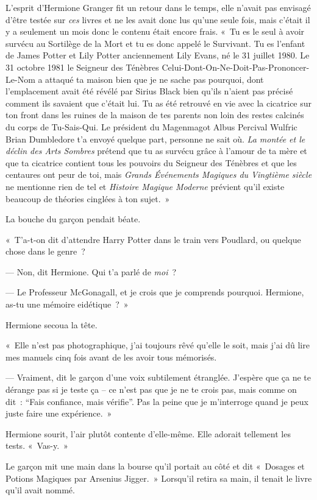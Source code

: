 L'esprit d'Hermione Granger fit un retour dans le temps, elle n'avait pas envisagé d'être testée sur \emph{ces} livres et ne les avait donc lus qu'une seule fois, mais c'était il y a seulement un mois donc le contenu était encore frais. «~Tu es le seul à avoir survécu au Sortilège de la Mort et tu es donc appelé le Survivant. Tu es l'enfant de James Potter et Lily Potter anciennement Lily Evans, né le 31 juillet 1980. Le 31 octobre 1981 le Seigneur des Ténèbres Celui-Dont-On-Ne-Doit-Pas-Prononcer-Le-Nom a attaqué ta maison bien que je ne sache pas pourquoi, dont l'emplacement avait été révélé par Sirius Black bien qu'ils n'aient pas précisé comment ils savaient que c'était lui. Tu as été retrouvé en vie avec la cicatrice sur ton front dans les ruines de la maison de tes parents non loin des restes calcinés du corps de Tu-Sais-Qui. Le président du Magenmagot Albus Percival Wulfric Brian Dumbledore t'a envoyé quelque part, personne ne sait où. \emph{La montée et le déclin des Arts Sombres} prétend que tu as survécu grâce à l'amour de ta mère et que ta cicatrice contient tous les pouvoirs du Seigneur des Ténèbres et que les centaures ont peur de toi, mais \emph{Grands Événements Magiques du Vingtième siècle} ne mentionne rien de tel et \emph{Histoire Magique Moderne} prévient qu'il existe beaucoup de théories cinglées à ton sujet.~»

La bouche du garçon pendait béate.

«~T'a-t-on dit d'attendre Harry Potter dans le train vers Poudlard, ou quelque chose dans le genre~?

--- Non, dit Hermione. Qui t'a parlé de \emph{moi}~?

--- Le Professeur McGonagall, et je crois que je comprends pourquoi. Hermione, as-tu une mémoire eidétique~?~»

Hermione secoua la tête.

«~Elle n'est pas photographique, j'ai toujours rêvé qu'elle le soit, mais j'ai dû lire mes manuels cinq fois avant de les avoir tous mémorisés.

--- Vraiment, dit le garçon d'une voix subtilement étranglée. J'espère que ça ne te dérange pas si je teste ça -- ce n'est pas que je ne te crois pas, mais comme on dit~: “Fais confiance, mais vérifie”. Pas la peine que je m'interroge quand je peux juste faire une expérience.~»

Hermione sourit, l'air plutôt contente d'elle-même. Elle adorait tellement les tests. «~Vas-y.~»

Le garçon mit une main dans la bourse qu'il portait au côté et dit «~Dosages et Potions Magiques par Arsenius Jigger.~» Lorsqu'il retira sa main, il tenait le livre qu'il avait nommé.


